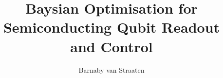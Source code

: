 
\usepackage{graphicx}
\usepackage{setspace}
\usepackage{epigraph}
\usepackage{siunitx}

\usepackage{listings}
\lstset{language=Python,tabsize=4}

\def\crest{{\texttt{[image: titlepage/beltcrest.pdf]}}}

\title{Baysian Optimisation for Semiconducting Qubit Readout and Control}
\author{Barnaby van Straaten}

